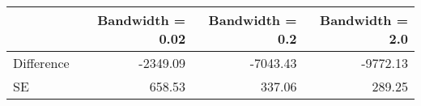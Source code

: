 \begin{table}[h!]
\begin{center}
\begin{tabular}{lrrr}
\toprule
 & Bandwidth = 0.02 & Bandwidth = 0.2 & Bandwidth = 2.0  \\
\hline
Difference & -2349.09 & -7043.43 & -9772.13 \\
SE & 658.53 & 337.06 & 289.25 \\
\bottomrule
\end{tabular}
\end{center}
\end{table}
